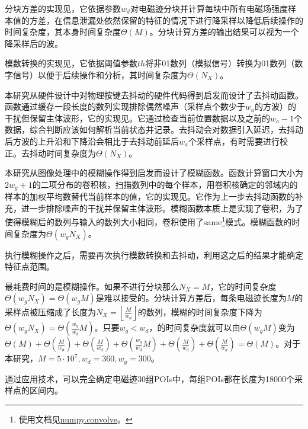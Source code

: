 {{	分块方差的实现见，它依据参数$w_d$对电磁迹分块并计算每块中所有电磁场强度样本值的方差，在信息泄漏处依然保留的特征的情况下进行降采样以降低后续操作的时间复杂度，其本身时间复杂度$\Theta(M)$。分块计算方差的输出结果可以视为一个降采样后的波。
	
	模数转换的实现见，它依据阈值参数$th$将非01数列（模拟信号）转换为01数列（数字信号）以便于后续操作和分析，其时间复杂度为$\Theta(N_X)$。
	
	本研究从硬件设计中对物理按键去抖动的硬件代码得到启发而设计了去抖动函数。函数通过缓存一段长度的数列实现排除偶然噪声（采样点个数少于$w_a$的方波）的干扰但保留主体波形，它的实现见。它通过检查当前位置数据以及之前的$w_a-1$个数据，综合判断应该如何解析当前状态并记录。去抖动会对数据引入延迟，去抖动后方波的上升沿和下降沿会相比于去抖动前延后$w_a$个采样点，有时需要进行校正。去抖动时间复杂度为$\Theta(N_X)$。
	
	本研究从图像处理中的模糊操作得到启发而设计了模糊函数。函数计算窗口大小为$2w_g+1$的二项分布的卷积核，扫描数列中的每个样本，用卷积核确定的邻域内的样本的加权平均数替代当前样本的值，它的实现见。它作为上一步去抖动函数的补充，进一步排除噪声的干扰并保留主体波形。模糊函数本质上是实现了卷积，为了使得模糊后的数列与输入的数列大小相同，卷积使用了same\footnote{使用文档见\href{https://numpy.org/doc/stable/reference/generated/numpy.convolve.html}{numpy.convolve}。}模式。模糊函数的时间复杂度为$\Theta(w_gN_X)$。
	
	执行模糊操作之后，需要再次执行模数转换和去抖动，利用这之后的结果才能确定特征点范围。

	\poifanwei 最耗费时间的是模糊操作。如果不进行分块那么$N_X=M$，它的时间复杂度$\Theta(w_gN_X)=\Theta(w_gM)$是难以接受的。分块计算方差后，每条电磁迹长度为$M$的采样点被压缩成了长度为$N_X=\left\lfloor\frac{M}{w_d}\right\rfloor$的数列，模糊的时间复杂度下降为$\Theta(w_gN_X)=\Theta(\frac{w_g}{w_d}M)$。只要$w_g<w_d$，\poifanwei 的时间复杂度就可以由$\Theta\left( w_gM\right) $变为$\Theta(M)+\Theta\left( \frac{M}{w_d}\right) +\Theta\left( \frac{M}{w_d}\right) +\Theta\left( \frac{w_g}{w_d}M\right) +\Theta\left( \frac{M}{w_d}\right) +\Theta\left( \frac{M}{w_d}\right) =\Theta(M)$。对于本研究，$M=5\cdot10^7,w_d=360,w_g=300$。
	
	通过应用\poifanwei 技术，可以完全确定电磁迹30组POIs中，每组POIs都在长度为18000个采样点的区间内。%
	
}}
